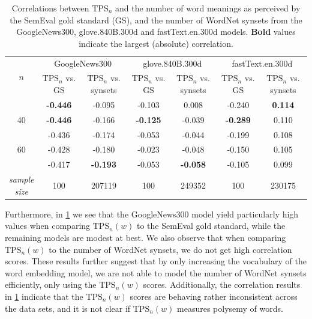 \begin{table}[H]
    \centering
    \begin{tabular}{ccccccc}
    \toprule
    \multicolumn{1}{c}{\multirow{2}{*}{$n$}} & \multicolumn{2}{c}{GoogleNews300}    & \multicolumn{2}{c}{glove.840B.300d}              & \multicolumn{2}{c}{fastText.en.300d}             \\
    \cmidrule(l){2-7} 
    \multicolumn{1}{c}{}                   & \makecell[tc]{$\text{TPS}_n$ vs.\\GS} & \makecell[tc]{$\text{TPS}_n$ vs.\\synsets} & \makecell[tc]{$\text{TPS}_n$ vs.\\GS} & \makecell[tc]{$\text{TPS}_n$ vs.\\synsets} & \makecell[tc]{$\text{TPS}_n$ vs.\\GS} & \makecell[tc]{$\text{TPS}_n$ vs.\\synsets} \\ \midrule
    \trcolor 10           & \textbf{-0.446}  & -0.095       & -0.103  & 0.008        & -0.240  & \textbf{0.114}        \\
    40           & \textbf{-0.446}  & -0.166       & \textbf{-0.125}  & -0.039       & \textbf{-0.289}  & 0.110        \\
    \trcolor 50           & -0.436  & -0.174       & -0.053  & -0.044       & -0.199  & 0.108        \\
    60           & -0.428  & -0.180       & -0.023  & -0.048       & -0.150  & 0.105        \\
    \trcolor 100          & -0.417  & \textbf{-0.193}       & -0.053  & \textbf{-0.058}       & -0.105  & 0.099        \\
    \midrule
    \makecell[tc]{\textit{sample}\\\textit{size}} & 100 & 207119 & 100 & 249352 & 100 & 230175 \\
    \bottomrule
    \end{tabular}
    \caption{Correlations between $\text{TPS}_n$ and the number of word meanings as perceived by the SemEval gold standard (GS), and the number of WordNet synsets from the GoogleNews300, glove.840B.300d and fastText.en.300d models. \textbf{Bold} values indicate the largest (absolute) correlation.}
    \label{table:tps-n-correlation-external-word-embeddings}
\end{table}
Furthermore, in \cref{table:tps-n-correlation-external-word-embeddings} we see that the GoogleNews300 model yield particularly high values when comparing $\text{TPS}_n(w)$ to the SemEval gold standard, while the remaining models are modest at best. We also observe that when comparing $\text{TPS}_n(w)$ to the number of WordNet synsets, we do not get high correlation scores. These results further suggest that by only increasing the vocabulary of the word embedding model, we are not able to model the number of WordNet synsets efficiently, only using the $\text{TPS}_n(w)$ scores. Additionally, the correlation results in \cref{table:tps-n-correlation-external-word-embeddings} indicate that the $\text{TPS}_n(w)$ scores are behaving rather inconsistent across the data sets, and it is not clear if $\text{TPS}_n(w)$ measures polysemy of words.

